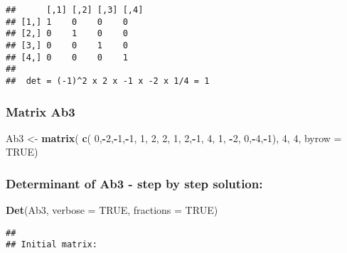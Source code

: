 \documentclass[
  10pt,
  a4paper,
]{article}
\newenvironment{Shaded}{\begin{snugshade}}{\end{snugshade}}
\newcommand{\AttributeTok}[1]{\textcolor[rgb]{0.13,0.29,0.53}{#1}}
\newcommand{\ConstantTok}[1]{\textcolor[rgb]{0.56,0.35,0.01}{#1}}
\newcommand{\DecValTok}[1]{\textcolor[rgb]{0.00,0.00,0.81}{#1}}
\newcommand{\FunctionTok}[1]{\textcolor[rgb]{0.13,0.29,0.53}{\textbf{#1}}}
\newcommand{\NormalTok}[1]{#1}
\newcommand{\OtherTok}[1]{\textcolor[rgb]{0.56,0.35,0.01}{#1}}
\newcommand{\SpecialCharTok}[1]{\textcolor[rgb]{0.81,0.36,0.00}{\textbf{#1}}}
\begin{document}
\begin{verbatim}
##      [,1] [,2] [,3] [,4]
## [1,] 1    0    0    0   
## [2,] 0    1    0    0   
## [3,] 0    0    1    0   
## [4,] 0    0    0    1   
## 
##  det = (-1)^2 x 2 x -1 x -2 x 1/4 = 1
\end{verbatim}

\hypertarget{matrix-ab3}{%
\subsubsection{Matrix Ab3}\label{matrix-ab3}}

\begin{Shaded}
\begin{Highlighting}[]
\NormalTok{Ab3 }\OtherTok{\textless{}{-}} \FunctionTok{matrix}\NormalTok{(}
        \FunctionTok{c}\NormalTok{( }\DecValTok{0}\NormalTok{,}\SpecialCharTok{{-}}\DecValTok{2}\NormalTok{,}\SpecialCharTok{{-}}\DecValTok{1}\NormalTok{,}\SpecialCharTok{{-}}\DecValTok{1}\NormalTok{,}
           \DecValTok{1}\NormalTok{, }\DecValTok{2}\NormalTok{, }\DecValTok{2}\NormalTok{, }\DecValTok{1}\NormalTok{,}
           \DecValTok{2}\NormalTok{,}\SpecialCharTok{{-}}\DecValTok{1}\NormalTok{, }\DecValTok{4}\NormalTok{, }\DecValTok{1}\NormalTok{,}
          \SpecialCharTok{{-}}\DecValTok{2}\NormalTok{, }\DecValTok{0}\NormalTok{,}\SpecialCharTok{{-}}\DecValTok{4}\NormalTok{,}\SpecialCharTok{{-}}\DecValTok{1}\NormalTok{), }\DecValTok{4}\NormalTok{, }\DecValTok{4}\NormalTok{, }\AttributeTok{byrow =} \ConstantTok{TRUE}\NormalTok{)}
\end{Highlighting}
\end{Shaded}

\hypertarget{determinant-of-ab3---step-by-step-solution}{%
\subsubsection{Determinant of Ab3 - step by step
solution:}\label{determinant-of-ab3---step-by-step-solution}}

\begin{Shaded}
\begin{Highlighting}[]
\FunctionTok{Det}\NormalTok{(Ab3, }\AttributeTok{verbose =} \ConstantTok{TRUE}\NormalTok{, }\AttributeTok{fractions =} \ConstantTok{TRUE}\NormalTok{)}
\end{Highlighting}
\end{Shaded}

\begin{verbatim}
## 
## Initial matrix:
\end{verbatim}
\end{document}
